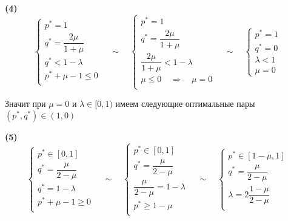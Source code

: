 \hspace{5mm}

\textbf{(4)}
$$
	\begin{cases}
		p^* = 1 \\
		q^* = \dfrac{2\mu}{1+\mu} \\
		q^* < 1 - \lambda \\
		p^* + \mu - 1 \leqslant 0 \\
	\end{cases}
	\quad \sim \quad
	\begin{cases}
		p^* = 1 \\
		q^* = \dfrac{2\mu}{1+\mu} \\
		\dfrac{2\mu}{1+\mu} < 1 - \lambda \\
		\mu \leqslant 0 \quad \Rightarrow \quad \mu = 0 \\
	\end{cases}
	\quad \sim \quad
	\begin{cases}
		p^* = 1 \\
		q^* = 0 \\
		\lambda < 1 \\
		\mu = 0
	\end{cases}
$$

Значит при $\mu=0$ и $\lambda \in [0, 1)$ имеем следующие оптимальные пары
$ (p^*, q^*) \in (1, 0)$

\hspace{5mm}

\textbf{(5)}
$$
	\begin{cases}
		p^* \in [0, 1] \\
		q^* = \dfrac{\mu}{2-\mu} \\
		q^* = 1 - \lambda \\
		p^* + \mu - 1 \geqslant 0 \\
	\end{cases}
	\quad \sim \quad
	\begin{cases}
		p^* \in [0, 1] \\
		q^* = \dfrac{\mu}{2-\mu} \\
		\dfrac{\mu}{2-\mu} = 1 - \lambda \\
		p^* \geqslant 1 - \mu \\
	\end{cases}
	\quad \sim \quad
	\begin{cases}
		p^* \in [1 - \mu, 1] \\
		q^* = \dfrac{\mu}{2-\mu} \\
		\lambda = 2\dfrac{1-\mu}{2-\mu} \\
	\end{cases}
$$

